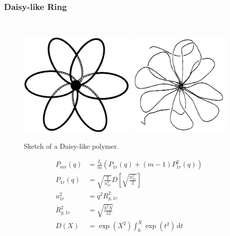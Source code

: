 \subsubsection{Daisy-like Ring}
\label{sect:DaisyLikeRing}
~\\
 \cite{Burchard1996}
\begin{figure}[htb]
\begin{center}
\includegraphics[width=0.5\textwidth,height=0.453\textwidth]{ma9603286f00001.png}
\includegraphics[width=0.45\textwidth,height=0.45\textwidth]{RosetteLikeMicelle.png}
\end{center}
\caption{Sketch of a Daisy-like polymer.}
\label{fig:DaisyLike}
\end{figure}

\begin{align}
P_{mr}(q) & = \frac{I_0}{m}\left(P_{1r}(q) + (m-1)P_{1r}^2(q)\right) \\
P_{1r}(q) & = \sqrt{\frac{2}{u_{1r}^2}} D\left[ \sqrt{\frac{u_{1r}^2}{2}} \right] \\
u_{1r}^2 &= q^2R^2_{g,1r} \\
R^2_{g,1r} &= \sqrt{\frac{b^2N}{12}} \\
D(X) &= \exp(X^2) \int_0^X \exp(t^2)\, \mathrm{d}t
\end{align}

\vspace{5mm}

